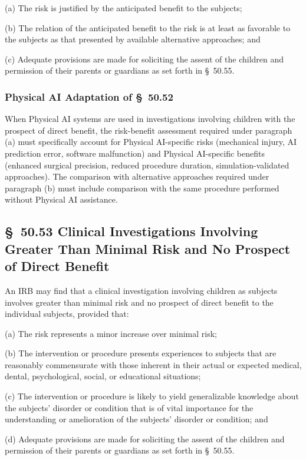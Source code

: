 \documentclass[11pt]{article}
\begin{document}
(a) The risk is justified by the anticipated benefit to the subjects;

(b) The relation of the anticipated benefit to the risk is at least as favorable to the subjects as that presented by available alternative approaches; and

(c) Adequate provisions are made for soliciting the assent of the children and permission of their parents or guardians as set forth in \S~50.55.

\subsubsection{Physical AI Adaptation of \S~50.52}

When Physical AI systems are used in investigations involving children with the prospect of direct benefit, the risk-benefit assessment required under paragraph (a) must specifically account for Physical AI-specific risks (mechanical injury, AI prediction error, software malfunction) and Physical AI-specific benefits (enhanced surgical precision, reduced procedure duration, simulation-validated approaches). The comparison with alternative approaches required under paragraph (b) must include comparison with the same procedure performed without Physical AI assistance.

\subsection{\S~50.53 Clinical Investigations Involving Greater Than Minimal Risk and No Prospect of Direct Benefit}

An IRB may find that a clinical investigation involving children as subjects involves greater than minimal risk and no prospect of direct benefit to the individual subjects, provided that:

(a) The risk represents a minor increase over minimal risk;

(b) The intervention or procedure presents experiences to subjects that are reasonably commensurate with those inherent in their actual or expected medical, dental, psychological, social, or educational situations;

(c) The intervention or procedure is likely to yield generalizable knowledge about the subjects' disorder or condition that is of vital importance for the understanding or amelioration of the subjects' disorder or condition; and

(d) Adequate provisions are made for soliciting the assent of the children and permission of their parents or guardians as set forth in \S~50.55.
\end{document}
